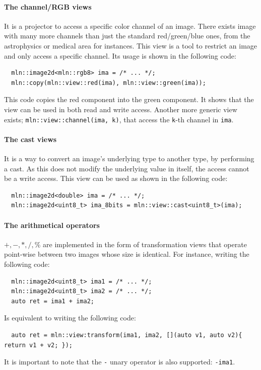 \paragraph{The channel/RGB views} It is a projector to access a specific color channel of an image. There exists image
with many more channels than just the standard red/green/blue ones, from the astrophysics or medical area for instances.
This view is a tool to restrict an image and only access a specific channel. Its usage is shown in the following code:
\begin{verbatim}
  mln::image2d<mln::rgb8> ima = /* ... */;
  mln::copy(mln::view::red(ima), mln::view::green(ima));
\end{verbatim}
This code copies the red component into the green component. It shows that the view can be used in both read and write
access. Another more generic view exists; \texttt{mln::view::channel(ima, k)}, that access the \texttt{k}-th
channel in \texttt{ima}.

\paragraph{The cast views} It is a way to convert an image's underlying type to another type, by performing a cast. As
this does not modify the underlying value in itself, the access cannot be a write access. This view can be used as shown
in
the following code:
\begin{verbatim}
  mln::image2d<double> ima = /* ... */;
  mln::image2d<uint8_t> ima_8bits = mln::view::cast<uint8_t>(ima);
\end{verbatim}

\paragraph{The arithmetical operators} \(+, -, *, /, \%\) are implemented in the form of transformation views that
operate point-wise between two images whose size is identical. For instance, writing the following code:
\begin{verbatim}
  mln::image2d<uint8_t> ima1 = /* ... */;
  mln::image2d<uint8_t> ima2 = /* ... */;
  auto ret = ima1 + ima2;
\end{verbatim}
Is equivalent to writing the following code:
\begin{verbatim}
  auto ret = mln::view:transform(ima1, ima2, [](auto v1, auto v2){ return v1 + v2; });
\end{verbatim}
It is important to note that the \texttt{-} unary operator is also supported: \texttt{-ima1}.


